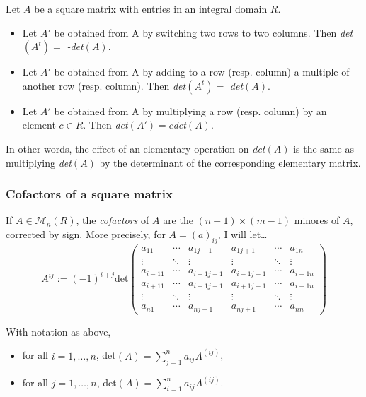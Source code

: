 \begin{lemma}
Let $A$ be a square matrix with entries in an integral domain $R$.
\begin{itemize}
  \item Let $A'$ be obtained from A by switching two rows to two columns. Then \emph{det}$(A^t)=$ \emph{-det}$(A)$.
  \item Let $A'$ be obtained from A by adding to a row (resp. column) a multiple of another row (resp. column). Then \emph{det}$(A^t)=$ \emph{det}$(A)$.
  \item Let $A'$ be obtained from A by multiplying a row (resp. column) by an element $c \in R$. Then \emph{det}$(A')=c$\emph{det}$(A)$.
\end{itemize}
In other words, the effect of an elementary operation on \emph{det}$(A)$ is the same as multiplying \emph{det}$(A)$ by the determinant of the corresponding elementary matrix.
\end{lemma}

\subsubsection{Cofactors of a square matrix}\label{square}
If $A \in \mathcal{M}_n(R)$, the \emph{cofactors} of $A$ are the $(n-1) \times (m-1)$ minores of $A$, corrected by sign. More precisely, for $A = (a)_{ij}$, I will let\dots
\[
A^{ij} := (-1)^{i+j}\textrm{det}\begin{pmatrix}
									a_{11} & \cdots & a_{1j-1} & a_{1j+1} & \cdots & a_{1n}\\
									\vdots & \ddots & \vdots   & \vdots   & \ddots & \vdots\\
									a_{i-11} & \cdots & a_{i-1j-1} & a_{i-1j+1} & \cdots & a_{i-1n}\\
									a_{i+11} & \cdots & a_{i+1j-1} & a_{i+1j+1} & \cdots & a_{i+1n}\\
									\vdots & \ddots & \vdots   & \vdots   & \ddots & \vdots\\
									a_{n1} & \cdots & a_{nj-1} & a_{nj+1} & \cdots & a_{nn}
								\end{pmatrix}
\]

\begin{lemma}
With notation as above,
\begin{itemize}
  \item for all $i = 1, \dots, n$, det$(A) = \sum_{j=1}^n a_{ij}A^{(ij)}$,
  \item for all $j = 1, \dots, n$, det$(A) = \sum_{i=1}^n a_{ij}A^{(ij)}$.
\end{itemize}
\end{lemma}

